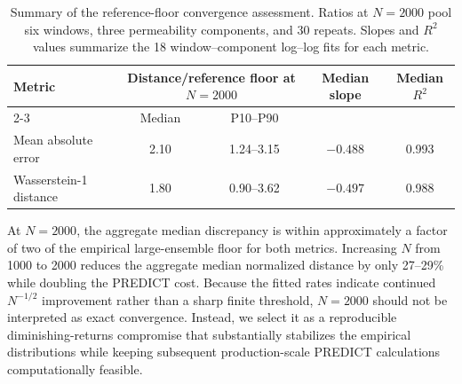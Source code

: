 \begin{table}[htbp]
  \centering
  \caption{Summary of the reference-floor convergence assessment. Ratios at
  $N=2000$ pool six windows, three permeability components, and 30 repeats.
  Slopes and $R^2$ values summarize the 18 window--component log--log fits for
  each metric.}
  \label{tab:si-predict-convergence}
  \begin{tabular}{@{}lcccc@{}}
    \toprule
    Metric &
    \multicolumn{2}{c}{Distance/reference floor at $N=2000$} &
    Median slope &
    Median $R^2$ \\
    \cmidrule(lr){2-3}
    & Median & P10--P90 & & \\
    \midrule
    Mean absolute error & 2.10 & 1.24--3.15 & $-0.488$ & 0.993 \\
    Wasserstein-1 distance & 1.80 & 0.90--3.62 & $-0.497$ & 0.988 \\
    \bottomrule
  \end{tabular}
\end{table}

At $N=2000$, the aggregate median discrepancy is within approximately a
factor of two of the empirical large-ensemble floor for both metrics.
Increasing $N$ from 1000 to 2000 reduces the aggregate median normalized
distance by only 27--29\% while doubling the PREDICT cost. Because the fitted
rates indicate continued $N^{-1/2}$ improvement rather than a sharp finite
threshold, $N=2000$ should not be interpreted as exact convergence. Instead,
we select it as a reproducible diminishing-returns compromise that
substantially stabilizes the empirical distributions while keeping subsequent
production-scale PREDICT calculations computationally feasible.
